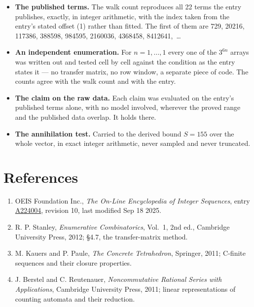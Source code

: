 \documentclass[11pt]{article}
\theoremstyle{definition}
\begin{document}
\begin{itemize}

\item {\bfseries The published terms.} The walk count reproduces all 22 terms the entry publishes, exactly, in integer arithmetic, with the index taken from the entry's stated offset (1) rather than fitted. The first of them are 729, 20216, 117386, 388598, 984595, 2160036, 4368458, 8412641,~\dots

\item {\bfseries An independent enumeration.} For $n = 1,\dots,1$ every one of the $3^{6n}$ arrays was written out and tested cell by cell against the condition as the entry states it --- no transfer matrix, no row window, a separate piece of code. The counts agree with the walk count and with the entry.

\item {\bfseries The claim on the raw data.} Each claim was evaluated on the entry's published terms alone, with no model involved, wherever the proved range and the published data overlap. It holds there.

\item {\bfseries The annihilation test.} Carried to the derived bound $S = 155$ over the whole vector, in exact integer arithmetic, never sampled and never truncated.

\end{itemize}

\section{References}

\begin{enumerate}

\item OEIS Foundation Inc., \emph{The On-Line Encyclopedia of Integer Sequences}, entry \href{https://oeis.org/A224004}{A224004}, revision 10, last modified Sep 18 2025.

\item R. P. Stanley, \emph{Enumerative Combinatorics}, Vol.~1, 2nd ed., Cambridge University Press, 2012; \S4.7, the transfer-matrix method.

\item M. Kauers and P. Paule, \emph{The Concrete Tetrahedron}, Springer, 2011; C-finite sequences and their closure properties.

\item J. Berstel and C. Reutenauer, \emph{Noncommutative Rational Series with Applications}, Cambridge University Press, 2011; linear representations of counting automata and their reduction.

\end{enumerate}
\end{document}
